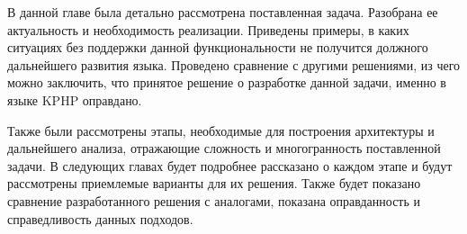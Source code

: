 \chapterconclusion
В данной главе была детально рассмотрена поставленная задача.
Разобрана ее актуальность и необходимость реализации.
Приведены примеры, в каких ситуациях без поддержки данной функциональности не получится должного дальнейшего развития языка.
Проведено сравнение с другими решениями, из чего можно заключить, что принятое решение о разработке данной задачи, именно в языке KPHP оправдано.

Также были рассмотрены этапы, необходимые для построения архитектуры и дальнейшего анализа, отражающие сложность и многогранность поставленной задачи.
В следующих главах будет подробнее рассказано о каждом этапе и будут рассмотрены приемлемые варианты для их решения.
Также будет показано сравнение разработанного решения с аналогами, показана оправданность и справедливость данных подходов.

